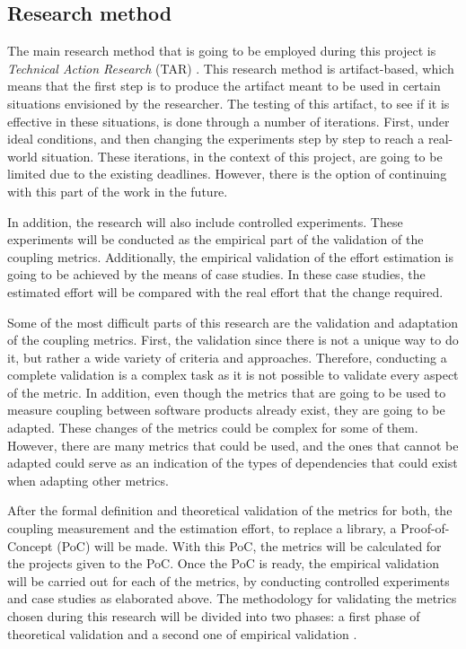 \subsection{Research method}
The main research method that is going to be employed during this project is \textit{Technical Action Research} (TAR) \cite{wieringa2012technical}.
This research method is artifact-based, which means that the first step is to produce the artifact meant to be used in certain situations envisioned by the researcher. The testing of this artifact, to see if it is effective in these situations, is done through a number of iterations. First, under ideal conditions, and then changing the experiments step by step to reach a real-world situation. These iterations, in the context of this project, are going to be limited due to the existing deadlines. However, there is the option of continuing with this part of the work in the future.

\blankl
In addition, the research will also include controlled experiments. These experiments will be conducted as the empirical part of the validation of the coupling metrics. Additionally, the empirical validation of the effort estimation is going to be achieved by the means of case studies. In these case studies, the estimated effort will be compared with the real effort that the change required.

\blankl
Some of the most difficult parts of this research are the validation and adaptation of the coupling metrics.
First, the validation since there is not a unique way to do it, but rather a wide variety of criteria and approaches. Therefore, conducting a complete validation is a complex task as it is not possible to validate every aspect of the metric.
In addition, even though the metrics that are going to be used to measure coupling between software products already exist, they are going to be adapted. These changes of the metrics could be complex for some of them. However, there are many metrics that could be used, and the ones that cannot be adapted could serve as an indication of the types of dependencies that could exist when adapting other metrics.

\blankl
After the formal definition and theoretical validation of the metrics for both, the coupling measurement and the estimation effort, to replace a library, a Proof-of-Concept (PoC) will be made. With this PoC, the metrics will be calculated for the projects given to the PoC. Once the PoC is ready, the empirical validation will be carried out for each of the metrics, by conducting controlled experiments and case studies as elaborated above.
The methodology for validating the metrics chosen during this research will be divided into two phases: a first phase of theoretical validation and a second one of empirical validation \cite{srinivasan2014software}.

